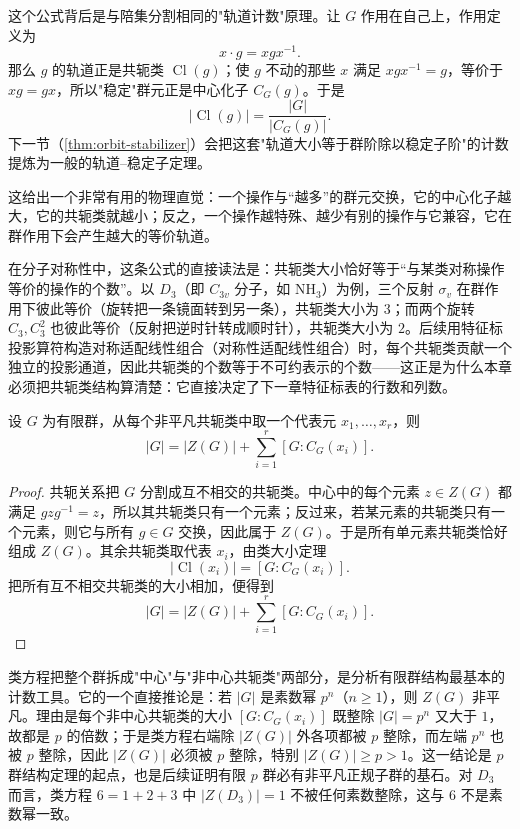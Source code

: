 这个公式背后是与陪集分割相同的"轨道计数"原理。让 $G$ 作用在自己上，作用定义为
\[
x\cdot g=xgx^{-1}.
\]
那么 $g$ 的轨道正是共轭类 $\operatorname{Cl}(g)$；使 $g$ 不动的那些 $x$ 满足 $xgx^{-1}=g$，等价于 $xg=gx$，所以"稳定"群元正是中心化子 $C_G(g)$。于是
\[
|\operatorname{Cl}(g)|=\frac{|G|}{|C_G(g)|}.
\]
下一节（\cref{thm:orbit-stabilizer}）会把这套"轨道大小等于群阶除以稳定子阶"的计数提炼为一般的轨道--稳定子定理。

这给出一个非常有用的物理直觉：一个操作与“越多”的群元交换，它的中心化子越大，它的共轭类就越小；反之，一个操作越特殊、越少有别的操作与它兼容，它在群作用下会产生越大的等价轨道。

在分子对称性中，这条公式的直接读法是：共轭类大小恰好等于“与某类对称操作等价的操作的个数”。以 $D_3$（即 $C_{3v}$ 分子，如 $\mathrm{NH_3}$）为例，三个反射 $\sigma_v$ 在群作用下彼此等价（旋转把一条镜面转到另一条），共轭类大小为 $3$；而两个旋转 $C_3,C_3^2$ 也彼此等价（反射把逆时针转成顺时针），共轭类大小为 $2$。后续用特征标投影算符构造对称适配线性组合（对称性适配线性组合）时，每个共轭类贡献一个独立的投影通道，因此共轭类的个数等于不可约表示的个数——这正是为什么本章必须把共轭类结构算清楚：它直接决定了下一章特征标表的行数和列数。

\begin{corollary}[类方程]
设 $G$ 为有限群，从每个非平凡共轭类中取一个代表元 $x_1,\dots,x_r$，则
\[
\lvert G\rvert
=
\lvert Z(G)\rvert
+
\sum_{i=1}^{r}[G:C_G(x_i)].
\label{eq:class-equation}
\]
\label{cor:class-equation}

\end{corollary}

\begin{proof}
共轭关系把 $G$ 分割成互不相交的共轭类。中心中的每个元素 $z\in Z(G)$ 都满足 $gzg^{-1}=z$，所以其共轭类只有一个元素；反过来，若某元素的共轭类只有一个元素，则它与所有 $g\in G$ 交换，因此属于 $Z(G)$。于是所有单元素共轭类恰好组成 $Z(G)$。其余共轭类取代表 $x_i$，由类大小定理
\[
|\operatorname{Cl}(x_i)|=[G:C_G(x_i)].
\]
把所有互不相交共轭类的大小相加，便得到
\[
|G|=|Z(G)|+\sum_{i=1}^r[G:C_G(x_i)].
\]
\end{proof}

类方程把整个群拆成"中心"与"非中心共轭类"两部分，是分析有限群结构最基本的计数工具。它的一个直接推论是：若 $|G|$ 是素数幂 $p^n$（$n\ge1$），则 $Z(G)$ 非平凡。理由是每个非中心共轭类的大小 $[G:C_G(x_i)]$ 既整除 $|G|=p^n$ 又大于 $1$，故都是 $p$ 的倍数；于是类方程右端除 $|Z(G)|$ 外各项都被 $p$ 整除，而左端 $p^n$ 也被 $p$ 整除，因此 $|Z(G)|$ 必须被 $p$ 整除，特别 $|Z(G)|\ge p>1$。这一结论是 $p$ 群结构定理的起点，也是后续证明有限 $p$ 群必有非平凡正规子群的基石。对 $D_3$ 而言，类方程 $6=1+2+3$ 中 $|Z(D_3)|=1$ 不被任何素数整除，这与 $6$ 不是素数幂一致。

